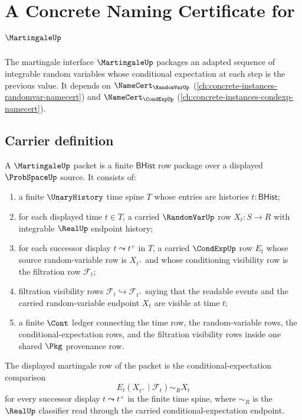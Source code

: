 \chapter{A Concrete Naming Certificate for $\MartingaleUp$}
\label{ch:concrete-instances-martingale-namecert}

The martingale interface $\MartingaleUp$ packages an adapted sequence of integrable random variables whose conditional expectation at each step is the previous value. It depends on $\NameCert_{\RandomVarUp}$ (\autoref{ch:concrete-instances-randomvar-namecert}) and $\NameCert_{\CondExpUp}$ (\autoref{ch:concrete-instances-condexp-namecert}).

\section{Carrier definition}
\label{sec:martingale-carrier}

\begin{definition}
\label{def:martingale-adapted-bhist-carrier}
A $\MartingaleUp$ packet is a finite $\mathsf{BHist}$ row package over a displayed $\ProbSpaceUp$ source. It consists of:
\begin{enumerate}
\item a finite $\UnaryHistory$ time spine $T$ whose entries are histories $t:\mathsf{BHist}$;
\item for each displayed time $t\in T$, a carried $\RandomVarUp$ row $X_t:S\to R$ with integrable $\RealUp$ endpoint history;
\item for each successor display $t\leadsto t^+$ in $T$, a carried $\CondExpUp$ row $E_t$ whose source random-variable row is $X_{t^+}$ and whose conditioning visibility row is the filtration row $\mathcal{F}_t$;
\item filtration visibility rows $\mathcal{F}_t\hookrightarrow\mathcal{F}_{t^+}$ saying that the readable events and the carried random-variable endpoint $X_t$ are visible at time $t$;
\item a finite $\Cont$ ledger connecting the time row, the random-variable rows, the conditional-expectation rows, and the filtration visibility rows inside one shared $\Pkg$ provenance row.
\end{enumerate}
The displayed martingale row of the packet is the conditional-expectation comparison
$$
E_t(X_{t^+}\mid\mathcal{F}_t)\sim_R X_t
$$
for every successor display $t\leadsto t^+$ in the finite time spine, where $\sim_R$ is the $\RealUp$ classifier read through the carried conditional-expectation endpoint.
\end{definition}

